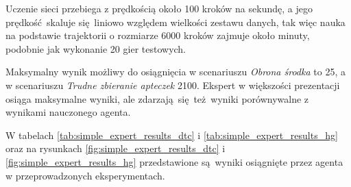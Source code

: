 \documentclass[polish,master,a4paper,oneside]{ppfcmthesis}
\begin{document}
Uczenie sieci przebiega z prędkością około 100 kroków na sekundę, a jego prędkość skaluje się liniowo względem wielkości zestawu danych, tak więc nauka na podstawie trajektorii o rozmiarze 6000 kroków zajmuje około minuty, podobnie jak wykonanie 20 gier testowych.

Maksymalny wynik możliwy do osiągnięcia w scenariuszu \textit{Obrona środka} to 25, a w scenariuszu \textit{Trudne zbieranie apteczek} 2100. Ekspert w większości prezentacji osiąga maksymalne wyniki, ale zdarzają się też wyniki porównywalne z wynikami nauczonego agenta.

W tabelach \ref{tab:simple_expert_results_dtc} i \ref{tab:simple_expert_results_hg} oraz na rysunkach \ref{fig:simple_expert_results_dtc} i \ref{fig:simple_expert_results_hg} przedstawione są wyniki osiągnięte przez agenta w przeprowadzonych eksperymentach.

\begin{figure}[H]
\end{figure}
\end{document}
